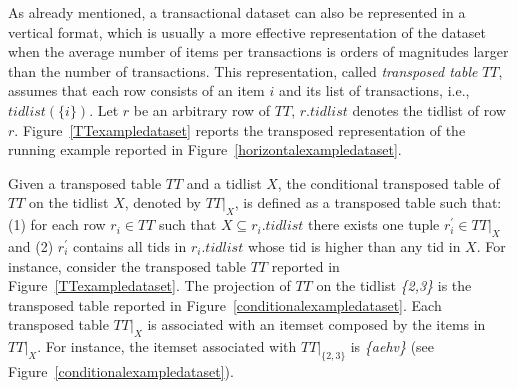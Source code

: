 As already mentioned, a transactional dataset can also be represented in a vertical format, which is
usually a more effective representation of the dataset when the average number
of items per transactions is orders of magnitudes larger than the number of
transactions.
This representation, called \textit{transposed table} $TT$, assumes that each
row consists of an item $i$ and its list of transactions, i.e.,
$tidlist(\{i\})$. Let $r$ be an arbitrary row of $TT$, $r.tidlist$ denotes the
tidlist of row $r$.
Figure~\ref{TTexampledataset} reports the transposed representation of the
running example reported in Figure~\ref{horizontalexampledataset}.

Given a transposed table $TT$ and a tidlist $X$, the conditional transposed
table of $TT$ on the tidlist $X$, denoted
by $TT|_{X}$, is defined as a transposed table such that:
(1) for each row $r_i\in TT$ such that $X\subseteq r_i.tidlist$ there exists one
tuple $r_i^{\prime}\in TT|_{X}$ and
(2) $r_i^{\prime}$ contains all tids in $r_i.tidlist$ whose tid is higher than
any tid in $X$.
For instance, consider the transposed table $TT$ reported in
Figure~\ref{TTexampledataset}. The
projection of $TT$ on the tidlist \textit{\{2,3\}} is the transposed table
reported in Figure~\ref{conditionalexampledataset}.
Each transposed table $TT|_{X}$ is associated with an itemset composed by the
items in $TT|_{X}$.
For instance, the itemset associated with $TT|_{\{2,3\}}$ is \textit{\{aehv\}}
(see Figure~\ref{conditionalexampledataset}).



